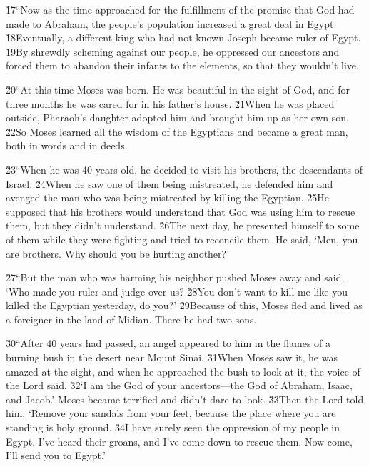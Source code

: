 \v{17}``Now as the time approached for the fulfillment of the promise that God had made to Abraham, the people's population increased a great deal in Egypt. \v{18}Eventually, a different king who had not known Joseph became ruler of Egypt. \v{19}By shrewdly scheming against our people, he oppressed our ancestors and forced them to abandon their infants to the elements, so that they wouldn't live.

\v{20}``At this time Moses was born. He was beautiful in the sight of God, and for three months he was cared for in his father's house. \v{21}When he was placed outside, Pharaoh's daughter adopted him and brought him up as her own son. \v{22}So Moses learned all the wisdom of the Egyptians and became a great man, both in words and in deeds.

\v{23}``When he was 40 years old, he decided to visit his brothers, the descendants of Israel. \v{24}When he saw one of them being mistreated, he defended him and avenged the man who was being mistreated by killing the Egyptian. \v{25}He supposed that his brothers would understand that God was using him to rescue them, but they didn't understand. \v{26}The next day, he presented himself to some of them while they were fighting and tried to reconcile them. He said, `Men, you are brothers. Why should you be hurting another?'

\v{27}``But the man who was harming his neighbor pushed Moses away and said, `Who made you ruler and judge over us? \v{28}You don't want to kill me like you killed the Egyptian yesterday, do you?' \v{29}Because of this, Moses fled and lived as a foreigner in the land of Midian. There he had two sons.

\v{30}``After 40 years had passed, an angel appeared to him in the flames of a burning bush in the desert near Mount Sinai. \v{31}When Moses saw it, he was amazed at the sight, and when he approached the bush to look at it, the voice of the Lord said, \v{32}`I am the God of your ancestors---the God of Abraham, Isaac, and Jacob.' Moses became terrified and didn't dare to look. \v{33}Then the Lord told him, `Remove your sandals from your feet, because the place where you are standing is holy ground. \v{34}I have surely seen the oppression of my people in Egypt, I've heard their groans, and I've come down to rescue them. Now come, I'll send you to Egypt.'

